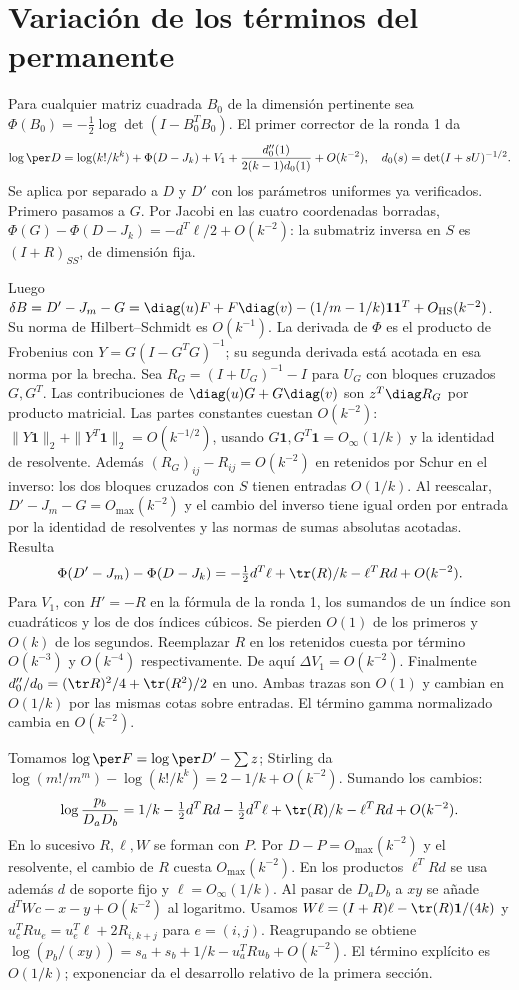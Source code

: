 \section{Variación de los términos del permanente}
Para cualquier matriz cuadrada $B_0$ de la dimensión pertinente
sea $\Phi(B_0)=-\tfrac12\log\det(I-B_0^TB_0)$. El primer corrector de la ronda 1 da
\[
 \log\per D=\log(k!/k^k)+\Phi(D-J_k)+V_1+\frac{d_0''(1)}{2(k-1)d_0(1)}+O(k^{-2}),
 \quad d_0(s)=\det(I+sU)^{-1/2}.
\]
Se aplica por separado a $D$ y $D'$ con los parámetros uniformes ya verificados.
Primero pasamos a $G$. Por Jacobi en las cuatro coordenadas borradas,
$\Phi(G)-\Phi(D-J_k)=-d^T\ell/2+O(k^{-2})$:
la submatriz inversa en $S$ es $(I+R)_{SS}$, de dimensión fija.

Luego $\delta B=D'-J_m-G=\diag(u)F+F\diag(v)-(1/m-1/k)\mathbf1\mathbf1^T
+O_{\rm HS}(k^{-2})$. Su norma de Hilbert--Schmidt es $O(k^{-1})$.
La derivada de $\Phi$ es el producto de Frobenius con $Y=G(I-G^TG)^{-1}$;
su segunda derivada está acotada en esa norma por la brecha. Sea
$R_G=(I+U_G)^{-1}-I$ para $U_G$ con bloques cruzados $G,G^T$.
Las contribuciones de $\diag(u)G+G\diag(v)$ son $z^T\diag R_G$ por producto
matricial. Las partes constantes cuestan $O(k^{-2})$:
$\|Y\mathbf1\|_2+\|Y^T\mathbf1\|_2=O(k^{-1/2})$, usando
$G\mathbf1,G^T\mathbf1=O_\infty(1/k)$ y la identidad de resolvente.
Además $(R_G)_{ij}-R_{ij}=O(k^{-2})$ en retenidos por Schur en el inverso:
los dos bloques cruzados con $S$ tienen entradas $O(1/k)$. Al reescalar,
$D'-J_m-G=O_{\max}(k^{-2})$ y el cambio del inverso tiene igual orden por entrada
por la identidad de resolventes y las normas de sumas absolutas acotadas.
Resulta
\[
 \Phi(D'-J_m)-\Phi(D-J_k)
 =-\tfrac12d^T\ell+\tr(R)/k-\ell^TRd+O(k^{-2}).
\]
Para $V_1$, con $H'=-R$ en la fórmula de la ronda 1, los sumandos de un índice son
cuadráticos y los de dos índices cúbicos. Se pierden $O(1)$ de los primeros y $O(k)$ de
los segundos. Reemplazar $R$ en los retenidos cuesta por término $O(k^{-3})$ y $O(k^{-4})$
respectivamente. De aquí $\Delta V_1=O(k^{-2})$. Finalmente
$d_0''/d_0=(\tr R)^2/4+\tr(R^2)/2$ en uno. Ambas trazas son $O(1)$ y cambian en
$O(1/k)$ por las mismas cotas sobre entradas. El término gamma normalizado cambia en $O(k^{-2})$.

Tomamos $\log\per F=\log\per D'-\sum z$; Stirling da
$\log(m!/m^m)-\log(k!/k^k)=2-1/k+O(k^{-2})$. Sumando los cambios:
\[
 \log\frac{p_b}{D_aD_b}
 =1/k-\tfrac12d^TRd-\tfrac12d^T\ell+\tr(R)/k-\ell^TRd+O(k^{-2}).
\]
En lo sucesivo $R,\ell,W$ se forman con $P$. Por $D-P=O_{\max}(k^{-2})$
y el resolvente, el cambio de $R$ cuesta $O_{\max}(k^{-2})$.
En los productos $\ell^TRd$ se usa además $d$ de soporte fijo y $\ell=O_\infty(1/k)$.
Al pasar de $D_aD_b$ a $xy$ se añade $d^TWc-x-y+O(k^{-2})$ al logaritmo.
Usamos $W\ell=(I+R)\ell-\tr(R)\mathbf1/(4k)$ y
$u_e^TRu_e=u_e^T\ell+2R_{i,k+j}$ para $e=(i,j)$.
Reagrupando se obtiene $\log(p_b/(xy))=s_a+s_b+1/k-u_a^TRu_b+O(k^{-2})$.
El término explícito es $O(1/k)$; exponenciar da el desarrollo relativo de la primera sección.
